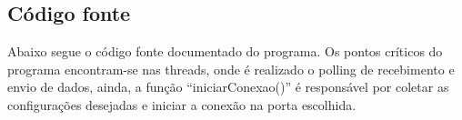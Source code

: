 \documentclass[brazil,times,12pt]{abnt}
\begin{document}
	\subsection*{Código fonte}
	Abaixo segue o código fonte documentado do programa. Os pontos críticos do
	programa encontram-se nas threads, onde é realizado o polling de recebimento e
	envio de dados, ainda, a função ``iniciarConexao()'' é responsável por coletar
	as configurações desejadas e iniciar a conexão na porta escolhida.
	
	\lstset{language=Python,tabsize=4, numbers=left, numberstyle=\tiny}
	
	



\end{document}
